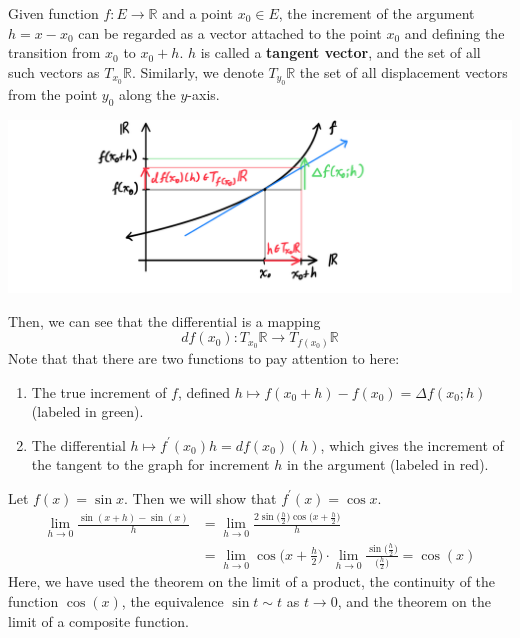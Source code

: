   \begin{definition}
    Given function $f: E \longrightarrow \mathbb{R}$ and a point $x_0 \in E$, the increment of the argument $h = x - x_0$ can be regarded as a vector attached to the point $x_0$ and defining the transition from $x_0$ to $x_0 + h$. $h$ is called a \textbf{tangent vector}, and the set of all such vectors as $T_{x_0} \mathbb{R}$. Similarly, we denote $T_{y_0} \mathbb{R}$ the set of all displacement vectors from the point $y_0$ along the $y$-axis. 
    \begin{center}
        \includegraphics[scale=0.25]{img/Tangent_Space_1_dimensional_in_R.PNG}
    \end{center}
    Then, we can see that the differential is a mapping
    \[df(x_0): T_{x_0} \mathbb{R} \longrightarrow T_{f(x_0)} \mathbb{R}\]
    Note that that there are two functions to pay attention to here: 
    \begin{enumerate}
      \item The true increment of $f$, defined $h \mapsto f(x_0 + h) - f(x_0) = \Delta f(x_0; h)$ (labeled in green). 
      \item The differential $h \mapsto f^\prime (x_0) h = df(x_0) (h)$, which gives the increment of the tangent to the graph for increment $h$ in the argument (labeled in red). 
    \end{enumerate}
  \end{definition}

  \begin{example}
    Let $f(x) = \sin{x}$. Then we will show that $f^\prime (x) = \cos{x}$. 
    \begin{align*}
        \lim_{h \rightarrow 0} \frac{\sin{(x+h)} - \sin(x)}{h} & = \lim_{h \rightarrow 0} \frac{2 \sin \big( \frac{h}{2} \big) \cos \big( x + \frac{h}{2} \big)}{h} \\
        & = \lim_{h \rightarrow 0} \cos \Big( x + \frac{h}{2} \Big) \cdot \lim_{h\rightarrow 0} \frac{\sin\big( \frac{h}{2}\big)}{\big(\frac{h}{2}\big)} = \cos(x)
    \end{align*}
    Here, we have used the theorem on the limit of a product, the continuity of the function $\cos(x)$, the equivalence $\sin{t} \sim t$ as $t \rightarrow 0$, and the theorem on the limit of a composite function. 
  \end{example}

